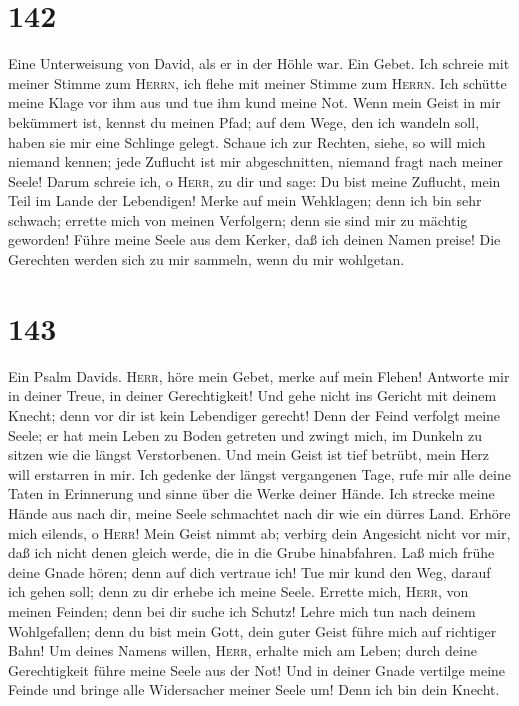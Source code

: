 \hypertarget{section-141}{%
\section{142}\label{section-141}}

 Eine Unterweisung von David, als er in der Höhle war. Ein
Gebet. Ich schreie mit meiner Stimme zum \textsc{Herrn}, ich flehe mit
meiner Stimme zum \textsc{Herrn}.  Ich schütte meine Klage
vor ihm aus und tue ihm kund meine Not.  Wenn mein Geist
in mir bekümmert ist, kennst du meinen Pfad; auf dem Wege, den ich
wandeln soll, haben sie mir eine Schlinge gelegt.  Schaue
ich zur Rechten, siehe, so will mich niemand kennen; jede Zuflucht ist
mir abgeschnitten, niemand fragt nach meiner Seele!  Darum
schreie ich, o \textsc{Herr}, zu dir und sage: Du bist meine Zuflucht,
mein Teil im Lande der Lebendigen!  Merke auf mein
Wehklagen; denn ich bin sehr schwach; errette mich von meinen
Verfolgern; denn sie sind mir zu mächtig geworden!  Führe
meine Seele aus dem Kerker, daß ich deinen Namen preise! Die Gerechten
werden sich zu mir sammeln, wenn du mir wohlgetan.

\hypertarget{section-142}{%
\section{143}\label{section-142}}

 Ein Psalm Davids. \textsc{Herr}, höre mein Gebet, merke
auf mein Flehen! Antworte mir in deiner Treue, in deiner Gerechtigkeit!
 Und gehe nicht ins Gericht mit deinem Knecht; denn vor
dir ist kein Lebendiger gerecht!  Denn der Feind verfolgt
meine Seele; er hat mein Leben zu Boden getreten und zwingt mich, im
Dunkeln zu sitzen wie die längst Verstorbenen.  Und mein
Geist ist tief betrübt, mein Herz will erstarren in mir. 
Ich gedenke der längst vergangenen Tage, rufe mir alle deine Taten in
Erinnerung und sinne über die Werke deiner Hände.  Ich
strecke meine Hände aus nach dir, meine Seele schmachtet nach dir wie
ein dürres Land.  Erhöre mich eilends, o \textsc{Herr}!
Mein Geist nimmt ab; verbirg dein Angesicht nicht vor mir, daß ich nicht
denen gleich werde, die in die Grube hinabfahren.  Laß
mich frühe deine Gnade hören; denn auf dich vertraue ich! Tue mir kund
den Weg, darauf ich gehen soll; denn zu dir erhebe ich meine Seele.
 Errette mich, \textsc{Herr}, von meinen Feinden; denn bei
dir suche ich Schutz!  Lehre mich tun nach deinem
Wohlgefallen; denn du bist mein Gott, dein guter Geist führe mich auf
richtiger Bahn!  Um deines Namens willen, \textsc{Herr},
erhalte mich am Leben; durch deine Gerechtigkeit führe meine Seele aus
der Not!  Und in deiner Gnade vertilge meine Feinde und
bringe alle Widersacher meiner Seele um! Denn ich bin dein Knecht.

